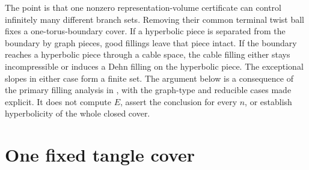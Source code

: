 \documentclass[11pt]{article}
\begin{document}
The point is that one nonzero representation-volume certificate can
control infinitely many different branch sets. Removing their common
terminal twist ball fixes a one-torus-boundary cover. If a hyperbolic
piece is separated from the boundary by graph pieces, good fillings
leave that piece intact. If the boundary reaches a hyperbolic piece
through a cable space, the cable filling either stays incompressible
or induces a Dehn filling on the hyperbolic piece. The exceptional
slopes in either case form a finite set.
The argument below is a consequence of the primary filling analysis
in \cite[Section~2]{bc}, with the graph-type and reducible cases made
explicit. It does not compute $E$, assert the conclusion for every
$n$, or establish hyperbolicity of the whole closed cover.

\section{One fixed tangle cover}
\end{document}
